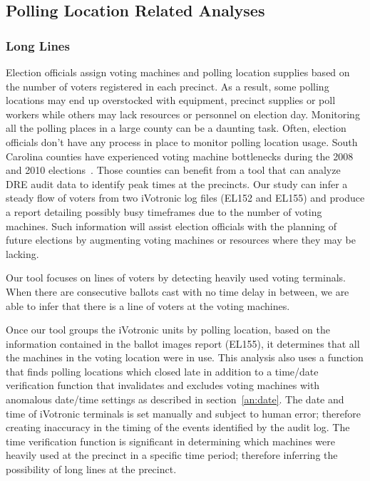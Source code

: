 \subsection{Polling Location Related Analyses}
\subsubsection{Long Lines}
Election officials assign voting machines and polling location supplies based on the number of voters registered in each precinct.  As a result, some polling locations may end up overstocked with equipment, precinct supplies or poll workers while others may lack resources or personnel on election day. Monitoring all the polling places in a large county can be a daunting task. Often, election officials don't have any process in place to monitor polling location usage. South Carolina counties have experienced voting machine bottlenecks during the 2008 and 2010 elections~\cite{Kreitman2010, Slade2008, U2010}.  Those counties can benefit from a tool that can analyze DRE audit data to identify peak times at the precincts.  Our study can infer a steady flow of voters from two iVotronic log files (EL152 and EL155) and produce a report detailing possibly busy timeframes due to the number of voting machines. Such information will assist election officials with the planning of future elections by augmenting voting machines or resources where they may be lacking.

Our tool focuses on lines of voters by detecting heavily used voting terminals. When there are consecutive ballots cast with no time delay in between, we are able to infer that there is a line of voters at the voting machines. 

Once our tool groups the iVotronic units by polling location, based on the information contained in the ballot images report (EL155), it determines that all the machines in the voting location were in use. This analysis also uses a function that finds polling locations which closed late in addition to a time/date verification function that invalidates and excludes voting machines with anomalous date/time settings as described in section~\ref{an:date}. The date and time of iVotronic terminals is set manually and subject to human error; therefore creating inaccuracy in the timing of the events identified by the audit log.  The time verification function is significant in determining which machines were heavily used at the precinct in a specific time period; therefore inferring the possibility of long lines at the precinct.

